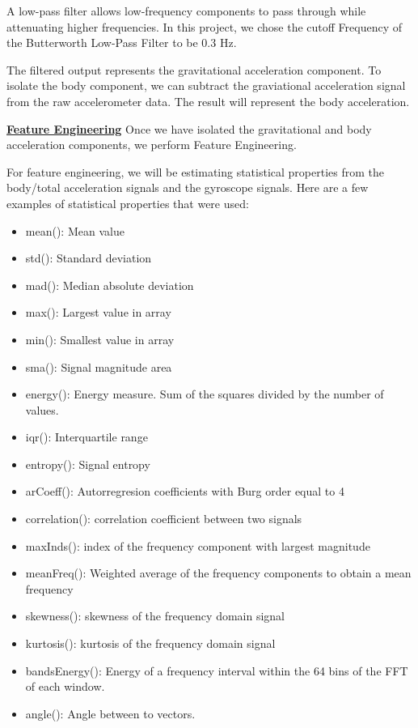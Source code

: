 \documentclass[conference]{IEEEtran}
\begin{document}
A low-pass filter allows low-frequency components to pass through while attenuating higher frequencies. In this project, we chose the cutoff Frequency of the Butterworth Low-Pass Filter to be 0.3 Hz. \newline 

The filtered output represents the gravitational acceleration component. To isolate the body component, we can subtract the graviational acceleration signal from the raw accelerometer data. The result will  represent the body acceleration. \newline 

\textbf{\underline{Feature Engineering}} \newline 
Once we have isolated the gravitational and body acceleration components, we perform Feature Engineering. \newline 

For feature engineering, we will be estimating statistical properties from the body/total acceleration signals and the gyroscope signals. Here are a few examples of statistical properties that were used:
\begin{itemize}
    \item mean(): Mean value
    \item std(): Standard deviation
    \item mad(): Median absolute deviation 
    \item max(): Largest value in array
    \item min(): Smallest value in array
    \item sma(): Signal magnitude area
    \item energy(): Energy measure. Sum of the squares divided by the number of values. 
    \item iqr(): Interquartile range 
    \item entropy(): Signal entropy
    \item arCoeff(): Autorregresion coefficients with Burg order equal to 4
    \item correlation(): correlation coefficient between two signals
    \item maxInds(): index of the frequency component with largest magnitude
    \item meanFreq(): Weighted average of the frequency components to obtain a mean frequency
    \item skewness(): skewness of the frequency domain signal 
    \item kurtosis(): kurtosis of the frequency domain signal 
    \item bandsEnergy(): Energy of a frequency interval within the 64 bins of the FFT of each window.
    \item angle(): Angle between to vectors.
\end{itemize}
\end{document}
